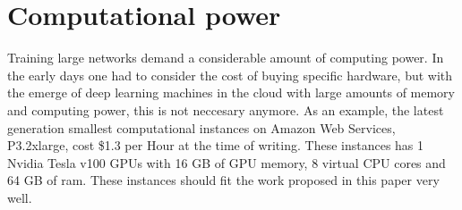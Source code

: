\section{Computational power}
Training large networks demand a considerable amount of computing power. In the early days one had to consider the cost of buying specific hardware, but with the emerge of deep learning machines in the cloud with large amounts of memory and computing power, this is not neccesary anymore. As an example, the latest generation smallest computational instances on Amazon Web Services, P3.2xlarge, cost \$1.3 per Hour at the time of writing. These instances has 1 Nvidia Tesla v100 GPUs with 16 GB of GPU memory, 8 virtual CPU cores and 64 GB of ram. These instances should fit the work proposed in this paper very well.